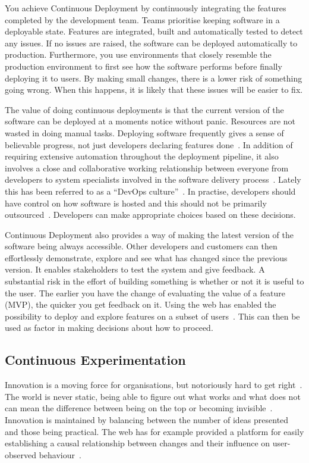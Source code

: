 \documentclass[english]{tktltiki2}
\begin{document}
You achieve Continuous Deployment by continuously integrating the features completed by the development team. Teams prioritise keeping software in a deployable state. Features are integrated, built and automatically tested to detect any issues. If no issues are raised, the software can be deployed automatically to production. Furthermore, you use environments that closely resemble the production environment to first see how the software performs before finally deploying it to users. By making small changes, there is a lower risk of something going wrong. When this happens, it is likely that these issues will be easier to fix.

The value of doing continuous deployments is that the current version of the software can be deployed at a moments notice without panic. Resources are not wasted in doing manual tasks. Deploying software frequently gives a sense of believable progress, not just developers declaring features done~\cite{Fow13a}. In addition of requiring extensive automation throughout the deployment pipeline, it also involves a close and collaborative working relationship between everyone from developers to system specialists involved in the software delivery process~\cite{HAB12, Fow13a}. Lately this has been referred to as a “DevOps culture”~\cite{Fow13a}. In practise, developers should have control on how software is hosted and this should not be primarily outsourced~\cite{HF11}. Developers can make appropriate choices based on these decisions.

Continuous Deployment also provides a way of making the latest version of the software being always accessible. Other developers and customers can then effortlessly demonstrate, explore and see what has changed since the previous version. It enables stakeholders to test the system and give feedback. A substantial risk in the effort of building something is whether or not it is useful to the user. The earlier you have the change of evaluating the value of a feature (MVP), the quicker you get feedback on it. Using the web has enabled the possibility to deploy and explore features on a subset of users~\cite{Fow06, Fow13a}. This can then be used as factor in making decisions about how to proceed.

\subsection{Continuous Experimentation}

Innovation is a moving force for organisations, but notoriously hard to get right~\cite{BE12}. The world is never static, being able to figure out what works and what does not can mean the difference between being on the top or becoming invisible~\cite{KLS09}. Innovation is maintained by balancing between the number of ideas presented and those being practical. The web has for example provided a platform for easily establishing a causal relationship between changes and their influence on user-observed behaviour~\cite{KLS09}.
\end{document}
